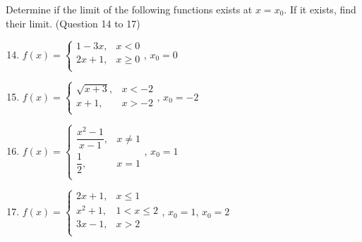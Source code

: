 \documentclass[12pt]{report}
\begin{document}
\begin{multicols}{2}
    \noindent Determine if the limit of the following functions exists at $x = x_0$. If it exists, find their limit. (Question 14 to 17)
    \begin{enumerate}
        \setcounter{enumi}{13}
        \item $f (x) = \left\{\begin{array}{rl}
                      1-3x, & x < 0    \\
                      2x+1, & x \geq 0 \\
                  \end{array}\right.$, $x_0 = 0$
        \item $f (x) = \left\{\begin{array}{rl}
                      \sqrt{x+3}, & x < -2 \\
                      x+1,        & x > -2 \\
                  \end{array}\right.$, $x_0 = -2$
        \item $f (x) = \left\{\begin{array}{rl}
                      \dfrac{x^2 - 1}{x-1}, & x \neq 1 \\
                      \dfrac{1}{2},         & x = 1    \\
                  \end{array}\right.$, $x_0 = 1$
        \item $f (x) = \left\{\begin{array}{rl}
                      2x + 1,  & x \leq 1     \\
                      x^2 + 1, & 1 < x \leq 2 \\
                      3x - 1,  & x > 2        \\
                  \end{array}\right.$, $x_0 = 1$, $x_0 = 2$
    \end{enumerate}
\end{multicols}
\end{document}
